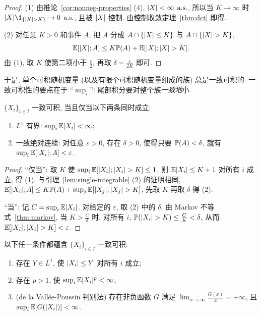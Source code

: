 \begin{proof}
(1) 由推论~\ref{cor:nonneg-properties} (4), $\abs{X}<\infty$ $\as$, 所以当 $K\to\infty$ 时 $\abs{X}\1_{\{\abs{X}>K\}}\to0$ $\as$, 且被 $\abs{X}$ 控制. 由控制收敛定理~\ref{thm:dct} 即得.

(2) 对任意 $K>0$ 和事件 $A$, 把 $A$ 分成 $A\cap\{\abs{X}\le K\}$ 与 $A\cap\{\abs{X}>K\}$,
\[
\E[\abs{X};A]\le K\P(A)+\E[\abs{X};\abs{X}>K].
\]
由 (1), 取 $K$ 使第二项小于 $\frac{\varepsilon}{2}$, 再取 $\delta=\frac{\varepsilon}{2K}$ 即可.
\end{proof}

于是, 单个可积随机变量 (以及有限个可积随机变量组成的族) 总是一致可积的. 一致可积性的要点在于 ``$\sup_i$'': 尾部积分要对整个族\emph{一致地}小.

\begin{proposition}[一致可积的等价刻画]\label{prop:ui-equivalent}
$\{X_i\}_{i\in I}$ 一致可积, 当且仅当以下两条同时成立:
\begin{enumerate}
\item $L^1$ 有界: $\sup_i\E\abs{X_i}<\infty$;
\item 一致绝对连续: 对任意 $\varepsilon>0$, 存在 $\delta>0$, 使得只要 $\P(A)<\delta$, 就有 $\sup_i\E[\abs{X_i};A]<\varepsilon$.
\end{enumerate}
\end{proposition}

\begin{proof}
``仅当'': 取 $K$ 使 $\sup_i\E[\abs{X_i};\abs{X_i}>K]\le1$, 则 $\E\abs{X_i}\le K+1$ 对所有 $i$ 成立, 得 (1). 与引理~\ref{lem:single-integrable} (2) 的证明相同, $\E[\abs{X_i};A]\le K\P(A)+\sup_j\E[\abs{X_j};\abs{X_j}>K]$, 先取 $K$ 再取 $\delta$ 得 (2).

``当'': 记 $C=\sup_i\E\abs{X_i}$. 对给定的 $\varepsilon$, 取 (2) 中的 $\delta$. 由 Markov 不等式~\ref{thm:markov}, 当 $K>\frac{C}{\delta}$ 时, 对所有 $i$, $\P(\abs{X_i}>K)\le\frac{C}{K}<\delta$, 从而 $\E[\abs{X_i};\abs{X_i}>K]<\varepsilon$.
\end{proof}

\begin{proposition}[一致可积的充分条件]\label{prop:ui-sufficient}
以下任一条件都蕴含 $\{X_i\}_{i\in I}$ 一致可积:
\begin{enumerate}
\item 存在 $Y\in L^1$, 使 $\abs{X_i}\le Y$ 对所有 $i$ 成立;
\item 存在 $p>1$, 使 $\sup_i\E\abs{X_i}^p<\infty$;
\item (de la Vall\'ee-Poussin 判别法) 存在非负函数 $G$ 满足 $\lim_{x\to\infty}\frac{G(x)}{x}=+\infty$, 且 $\sup_i\E[G(\abs{X_i})]<\infty$.
\end{enumerate}
\end{proposition}

